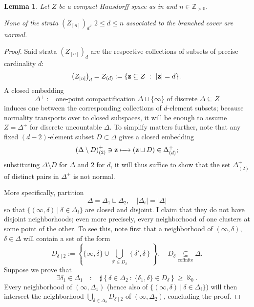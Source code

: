\documentclass[11pt,leqno]{article}
\theoremstyle{plain}
\newtheorem{lemma}{Lemma}[section]
\theoremstyle{plain}
\theoremstyle{plain}
\numberwithin{equation}{section}
\theoremstyle{nonumberplain}
\newtheorem{proof}{Proof}
\newcommand\bZ{{\mathbb Z}}
\newcommand\1{{\bf 1}}
\begin{document}
\begin{lemma}\label{le:strt.not.norm}
  Let $Z$ be a compact Hausdorff space as in  and $n\in \bZ_{>0}$.
  
  None of the strata $\left(Z_{[n]}\right)_d$, $2\le d\le n$ associated to the branched cover  are normal.
\end{lemma}
\begin{proof}
  Said strata $\left(Z_{[n]}\right)_d$ are the respective collections of subsets of precise cardinality $d$:
  \begin{equation*}
    \left(Z_{[n]}\right)_d
    =
    Z_{(d)}
    :=
    \left\{{\bf z}\subseteq Z\ :\ |{\bf z}|=d\right\}.
  \end{equation*}
  A closed embedding
  \begin{equation*}
    \Delta^+:=\text{one-point compactification $\Delta\sqcup\{\infty\}$ of discrete }\Delta
    \subseteq Z
  \end{equation*}
  induces one between the corresponding collections of $d$-element subsets; because \cite[Theorem 15.4(a)]{wil_top} normality transports over to closed subspaces, it will be enough to assume $Z=\Delta^+$ for discrete uncountable $\Delta$. To simplify matters further, note that any fixed $(d-2)$-element subset $D\subset \Delta$ gives a closed embedding
  \begin{equation*}
    \left(\Delta\setminus D\right)^+_{(2)}
    \ni
    {\bf z}
    \xmapsto{\quad}
    \left({\bf z}\sqcup D\right)
    \in
    \Delta^+_{(d)};
  \end{equation*}
  substituting $\Delta\setminus D$ for $\Delta$ and $2$ for $d$, it will thus suffice to show that the set $\Delta^+_{(2)}$ of distinct pairs in $\Delta^+$ is not normal.

  More specifically, partition
  \begin{equation*}
    \Delta=\Delta_1\sqcup \Delta_2
    ,\quad
    |\Delta_i|=|\Delta|
  \end{equation*}
  so that $\{(\infty,\delta)\ |\ \delta\in \Delta_i\}$ are closed and disjoint. I claim that they do not have disjoint neighborhoods; even more precisely, every neighborhood of one clusters at some point of the other. To see this, note first that a neighborhood of $(\infty,\delta)$, $\delta\in\Delta$ will contain a set of the form
  \begin{equation}\label{eq:ddel2}
    D_{\delta\mid 2}
    :=
    \left\{\{\infty,\delta\}\cup\bigcup_{\delta'\in D_{\delta}}\left\{\delta',\delta\right\}\right\}
    ,\quad
    D_{\delta}\underset{\text{cofinite}}{\subseteq}\Delta.
  \end{equation}
  Suppose we prove that
  \begin{equation}\label{eq:some.del1.inf}
    \exists \delta_1\in \Delta_1
    \quad:\quad
    \sharp\left\{\delta\in \Delta_2\ :\ \{\delta_1,\delta\}\in D_{\delta}\right\}\ge \aleph_0.
  \end{equation}
  Every neighborhood of $(\infty,\Delta_1)$ (hence also of $\{(\infty,\delta)\ |\ \delta\in \Delta_i\}$) will then intersect the neighborhood $\bigcup_{\delta\in \Delta_2}D_{\delta\mid 2}$ of $(\infty,\Delta_2)$, concluding the proof.


\end{proof}
\end{document}
